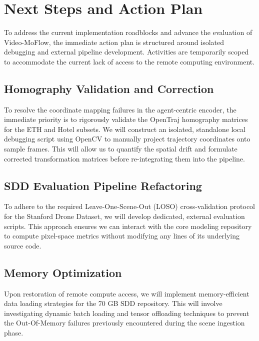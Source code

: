\section{Next Steps and Action Plan}

To address the current implementation roadblocks and advance the evaluation of Video-MoFlow, the immediate action plan is structured around isolated debugging and external pipeline development. Activities are temporarily scoped to accommodate the current lack of access to the remote computing environment.

\subsection{Homography Validation and Correction}
To resolve the coordinate mapping failures in the agent-centric encoder, the immediate priority is to rigorously validate the OpenTraj homography matrices for the ETH and Hotel subsets. We will construct an isolated, standalone local debugging script using OpenCV to manually project trajectory coordinates onto sample frames. This will allow us to quantify the spatial drift and formulate corrected transformation matrices before re-integrating them into the pipeline.

\subsection{SDD Evaluation Pipeline Refactoring}
To adhere to the required Leave-One-Scene-Out (LOSO) cross-validation protocol for the Stanford Drone Dataset, we will develop dedicated, external evaluation scripts. This approach ensures we can interact with the core modeling repository to compute pixel-space metrics without modifying any lines of its underlying source code. 

\subsection{Memory Optimization}
Upon restoration of remote compute access, we will implement memory-efficient data loading strategies for the 70 GB SDD repository. This will involve investigating dynamic batch loading and tensor offloading techniques to prevent the Out-Of-Memory failures previously encountered during the scene ingestion phase.

